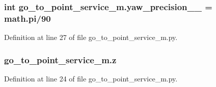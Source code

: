 \subsubsection[{\texorpdfstring{yaw\+\_\+precision\+\_\+2\+\_\+}{yaw_precision_2_}}]{\setlength{\rightskip}{0pt plus 5cm}int go\+\_\+to\+\_\+point\+\_\+service\+\_\+m.\+yaw\+\_\+precision\+\_\+\_\+ = math.\+pi/90}\hypertarget{namespacego__to__point__service__m_aa642aefafe9c9c963a86f01c5a256e23}{}\label{namespacego__to__point__service__m_aa642aefafe9c9c963a86f01c5a256e23}


Definition at line 27 of file go\+\_\+to\+\_\+point\+\_\+service\+\_\+m.\+py.

\subsubsection[{\texorpdfstring{z}{z}}]{\setlength{\rightskip}{0pt plus 5cm}go\+\_\+to\+\_\+point\+\_\+service\+\_\+m.\+z}\hypertarget{namespacego__to__point__service__m_aa0ed9dc81f0153863a2a971384dbcba3}{}\label{namespacego__to__point__service__m_aa0ed9dc81f0153863a2a971384dbcba3}


Definition at line 24 of file go\+\_\+to\+\_\+point\+\_\+service\+\_\+m.\+py.

